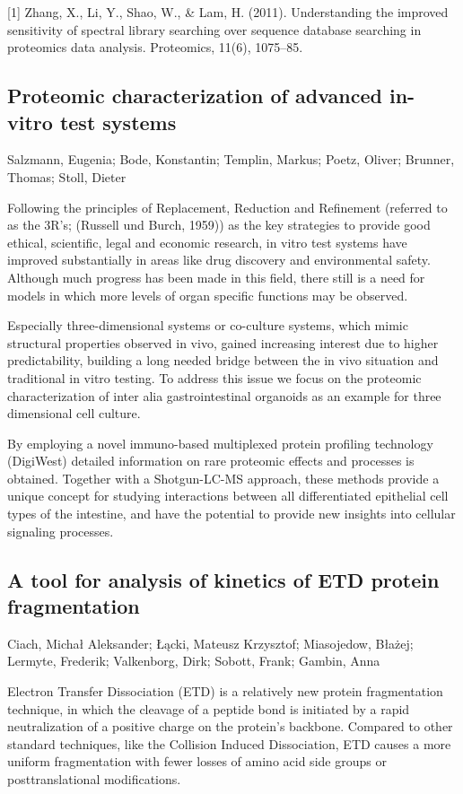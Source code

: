 {[1] Zhang, X., Li, Y., Shao, W., \& Lam, H. (2011). Understanding the improved sensitivity of spectral library searching over sequence database searching in proteomics data analysis. Proteomics, 11(6), 1075–85.


\subsection*{\color{eubicRed} Proteomic characterization of advanced in-vitro test systems}
{\color{eubicGray}Salzmann, Eugenia;
Bode, Konstantin;
Templin, Markus;
Poetz, Oliver;
Brunner, Thomas;
Stoll, Dieter}

Following the principles of Replacement, Reduction and Refinement (referred to as the 3R’s; (Russell und Burch, 1959)) as the key strategies to provide good ethical, scientific, legal and economic research, in vitro test systems have improved substantially in areas like drug discovery and environmental safety. Although much progress has been made in this field, there still is a need for models in which more levels of organ specific functions may be observed. 

Especially three-dimensional systems or co-culture systems, which mimic structural properties observed in vivo, gained increasing interest due to higher predictability, building a long needed bridge between the in vivo situation and traditional in vitro testing. To address this issue we focus on the proteomic characterization of inter alia gastrointestinal organoids as an example for three dimensional cell culture.

By employing a novel immuno-based multiplexed protein profiling technology (DigiWest) detailed information on rare proteomic effects and processes is obtained. Together with a Shotgun-LC-MS approach, these methods provide a unique concept for studying interactions between all differentiated epithelial cell types of the intestine, and have the potential to provide new insights into cellular signaling processes.


\subsection*{\color{eubicRed} A tool for analysis of kinetics of ETD protein fragmentation}
{\color{eubicGray}Ciach, Michał Aleksander;
Łącki, Mateusz Krzysztof;
Miasojedow, Błażej;
Lermyte, Frederik;
Valkenborg, Dirk;
Sobott, Frank;
Gambin, Anna}

Electron Transfer Dissociation (ETD) is a relatively new protein fragmentation technique, in which the cleavage of a peptide bond is initiated by a rapid neutralization of a positive charge on the protein's backbone. Compared to other standard techniques, like the Collision Induced Dissociation, ETD causes a more uniform fragmentation with fewer losses of amino acid side groups or posttranslational modifications.

}
